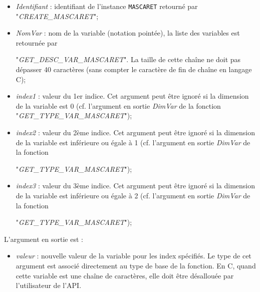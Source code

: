 \documentclass[a4paper,11pt]{article}
\begin{document}
 \begin{itemize}
 
    \item \textit{Identifiant} : identifiant de l'instance \texttt{MASCARET} retourn\'e par "\textit{CREATE\_MASCARET}";
    \vspace{0.5cm}
    \item \textit{NomVar} : nom de la variable (notation point\'ee), la liste des variables est retourn\'ee par
    
     "\textit{GET\_DESC\_VAR\_MASCARET}". La taille de cette cha\^ine ne doit pas d\'epasser 40 caract\`eres (sans compter le caract\`ere de fin de cha\^ine en langage C);
    \vspace{0.5cm}
    \item \textit{index1} : valeur du 1er indice. Cet argument peut \^etre ignor\'e si la dimension de la variable est 0 (cf. l'argument en sortie \textit{DimVar} de la fonction "\textit{GET\_TYPE\_VAR\_MASCARET}");
    \vspace{0.5cm}
    \item \textit{index2} : valeur du 2\`eme indice. Cet argument peut \^etre ignor\'e si la dimension de la variable est inf\'erieure ou \'egale \`a 1 (cf. l'argument en sortie \textit{DimVar} de la fonction
    
     "\textit{GET\_TYPE\_VAR\_MASCARET}");
     \vspace{0.5cm}
    \item \textit{index3} : valeur du 3\`eme indice. Cet argument peut \^etre ignor\'e si la dimension de la variable est inf\'erieure ou \'egale \`a 2 (cf. l'argument en sortie \textit{DimVar} de la fonction
    
     "\textit{GET\_TYPE\_VAR\_MASCARET}");

 \end{itemize}

\vspace{0.5cm}

 L'argument en sortie est :
 
 \vspace{0.5cm}
 
 \begin{itemize}
 
    \item \textit{valeur} : nouvelle valeur de la variable pour les index sp\'ecifi\'es. Le type de cet argument est associ\'e directement au type de base de la fonction. En C, quand cette variable est une cha\^ine de caract\`eres, elle doit \^etre d\'esallou\'ee par l'utilisateur de l'API.
     
 \end{itemize}
\end{document}
